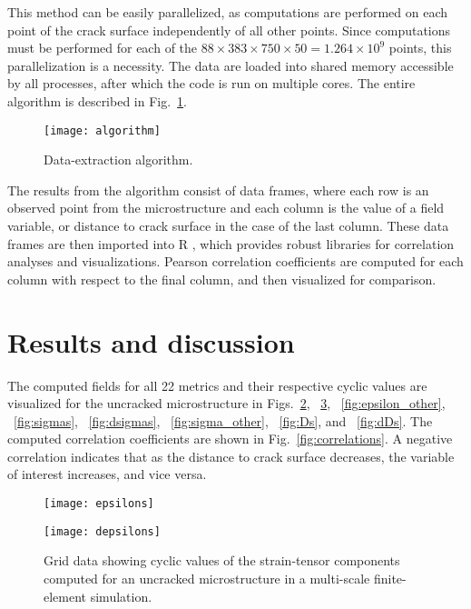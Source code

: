 This method can be easily parallelized, as computations are performed on each point of the crack surface independently of all other points. Since computations must be performed for each of the $88 \times 383 \times 750 \times 50 = 1.264\times 10^{9}$ points, this parallelization is a necessity.  The data are loaded into shared memory accessible by all processes, after which the code is run on multiple cores. The entire algorithm is described in Fig.~\ref{fig:algorithm}.
\begin{figure}[b]
  \centering
    \texttt{[image: algorithm]}
    \caption{Data-extraction algorithm.}
    \label{fig:algorithm}
\end{figure}

The results from the algorithm consist of data frames, where each row is an observed point from the microstructure and each column is the value of a field variable, or distance to crack surface in the case of the last column. These data frames are then imported into R \cite{statistical2009r}, which provides robust libraries for correlation analyses and visualizations. Pearson correlation coefficients are computed for each column with respect to the final column, and then visualized for comparison.

\section{Results and discussion}\label{results}
The computed fields for all 22 metrics and their respective cyclic values are visualized for the uncracked microstructure in Figs.~\ref{fig:epsilons}, ~\ref{fig:depsilons}, ~\ref{fig:epsilon_other}, ~\ref{fig:sigmas}, ~\ref{fig:dsigmas}, ~\ref{fig:sigma_other}, ~\ref{fig:Ds}, and ~\ref{fig:dDs}. The computed correlation coefficients are shown in Fig.~\ref{fig:correlations}. A negative correlation indicates that as the distance to crack surface decreases, the variable of interest increases, and vice versa.

\begin{figure}[p]
  \centering
    \texttt{[image: epsilons]}
    \label{fig:epsilons}
\end{figure}

\begin{figure}[p]
  \centering
    \texttt{[image: depsilons]}
    \caption{Grid data showing cyclic values of the strain-tensor components computed for an uncracked microstructure in a multi-scale finite-element simulation.}
    \label{fig:depsilons}
\end{figure}

